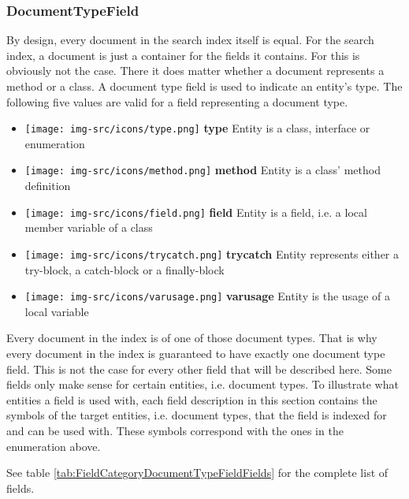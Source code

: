 

\subsubsection{DocumentTypeField}
\label{sec:FieldCategoryDocumentTypeField}

By design, every document in the search index itself is equal. 
For the search index, a document is just a container for the fields it contains. For \cname this is obviously not the case. 
There it does matter whether a document represents a method or a class. 
A document type field is used to indicate an entity's type. The following five values are valid for a field representing a document type.
    
\begin{itemize}
	\item \texttt{[image: img-src/icons/type.png]} \textbf{type} Entity is a class, interface or enumeration
	\item \texttt{[image: img-src/icons/method.png]} \textbf{method} Entity is a class' method definition
	\item \texttt{[image: img-src/icons/field.png]} \textbf{field} Entity is a field, i.e. a local member variable of a class
	\item \texttt{[image: img-src/icons/trycatch.png]} \textbf{trycatch} Entity represents either a try-block, a catch-block or a finally-block
	\item \texttt{[image: img-src/icons/varusage.png]} \textbf{varusage} Entity is the usage of a local variable
\end{itemize}

Every document in the index is of one of those document types. That is why every document in the index is guaranteed to have exactly one document type field. 
This is not the case for every other field that will be described here. Some fields only make sense for certain entities, i.e. document types.
To illustrate what entities a field is used with, each field description in this section contains the symbols of the target entities, i.e. document types, 
that the field is indexed for and can be used with.
These symbols correspond with the ones in the enumeration above. 

See table \ref{tab:FieldCategoryDocumentTypeFieldFields} for the complete list of fields.

